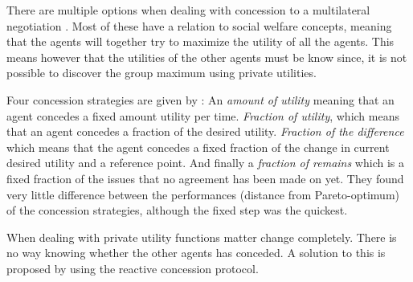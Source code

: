 
There are multiple options when dealing with concession to a multilateral negotiation \citep{endriss2006monotonic}. Most of these have a relation to social welfare concepts, meaning that the agents will together try to maximize the utility of all the agents. This means however that the utilities of the other agents must be know since, it is not possible to discover the group maximum using private utilities.

Four concession strategies are given by \citet{wu2009efficient}: An \textit{amount of utility} meaning that an agent concedes a fixed amount utility per time. \textit{Fraction of utility}, which means that an agent concedes a fraction of the desired utility. \textit{Fraction of the difference} which means that the agent concedes a fixed fraction of the change in current desired utility and a reference point. And finally a \textit{fraction of remains} which is a fixed fraction of the issues that no agreement has been made on yet. They found very little difference between the performances (distance from Pareto-optimum) of the concession strategies, although the fixed step was the quickest. 

When dealing with private utility functions matter change completely. There is no way knowing whether the other agents has conceded. A solution to this is proposed by \citet{zheng2015automated} using the reactive concession protocol.





